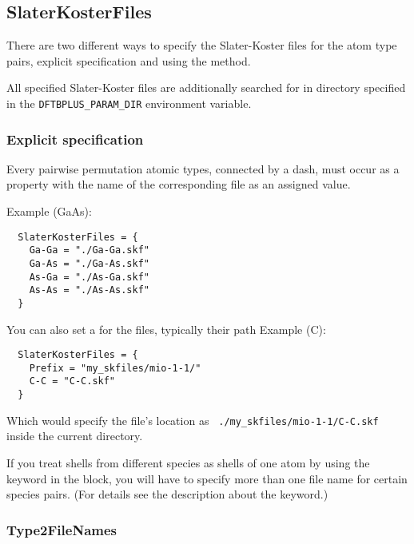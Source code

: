 \subsection{SlaterKosterFiles}
\label{sec:dftbp.SlaterKosterFiles}

There are two different ways to specify the Slater-Koster files for
the atom type pairs, explicit specification and using the
 method.

All specified Slater-Koster files are additionally searched for in directory specified in the
\texttt{DFTBPLUS\_PARAM\_DIR} environment variable.

\subsubsection{Explicit specification}

Every pairwise permutation atomic types, connected by a dash, must
occur as a property with the name of the corresponding file as an
assigned value.

Example (GaAs):
  \invparskip
\begin{verbatim}
  SlaterKosterFiles = {
    Ga-Ga = "./Ga-Ga.skf"
    Ga-As = "./Ga-As.skf"
    As-Ga = "./As-Ga.skf"
    As-As = "./As-As.skf"
  }
\end{verbatim}

You can also set a  for the files, typically their path
Example (C):
  \invparskip
\begin{verbatim}
  SlaterKosterFiles = {
    Prefix = "my_skfiles/mio-1-1/"
    C-C = "C-C.skf"
  }
\end{verbatim}
Which would specify the file's location as {\tt
  ./my\_skfiles/mio-1-1/C-C.skf} inside the current directory.

If you treat shells from different species as shells of one atom by
using the  keyword in the
 block, you will have to specify more than one
file name for certain species pairs. (For details see the description
about the  keyword.)

\subsubsection{Type2FileNames\cb}
\label{sec:dftbp.Type2FileNames}

